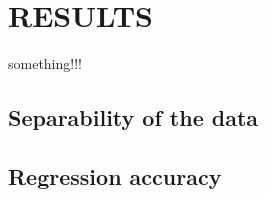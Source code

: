 \documentclass[a4paper, 10pt, conference]{ieeeconf}      %
\begin{document}
	
	
	

	
	\section{RESULTS}
	
	something!!! 
	
	\subsection{Separability of the data} 


	\subsection{Regression accuracy} 
\end{document}

